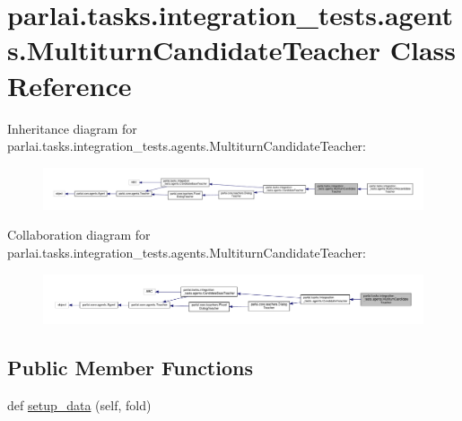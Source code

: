 \hypertarget{classparlai_1_1tasks_1_1integration__tests_1_1agents_1_1MultiturnCandidateTeacher}{}\section{parlai.\+tasks.\+integration\+\_\+tests.\+agents.\+Multiturn\+Candidate\+Teacher Class Reference}
\label{classparlai_1_1tasks_1_1integration__tests_1_1agents_1_1MultiturnCandidateTeacher}


Inheritance diagram for parlai.\+tasks.\+integration\+\_\+tests.\+agents.\+Multiturn\+Candidate\+Teacher\+:
\nopagebreak
\begin{figure}[H]
\begin{center}
\leavevmode
\includegraphics[width=350pt]{d1/d67/classparlai_1_1tasks_1_1integration__tests_1_1agents_1_1MultiturnCandidateTeacher__inherit__graph}
\end{center}
\end{figure}


Collaboration diagram for parlai.\+tasks.\+integration\+\_\+tests.\+agents.\+Multiturn\+Candidate\+Teacher\+:
\nopagebreak
\begin{figure}[H]
\begin{center}
\leavevmode
\includegraphics[width=350pt]{da/d2e/classparlai_1_1tasks_1_1integration__tests_1_1agents_1_1MultiturnCandidateTeacher__coll__graph}
\end{center}
\end{figure}
\subsection*{Public Member Functions}
\begin{DoxyCompactItemize}
\item 
def \hyperlink{classparlai_1_1tasks_1_1integration__tests_1_1agents_1_1MultiturnCandidateTeacher_aed2bfff52c3db13cb2a0d2acf41fdb8f}{setup\+\_\+data} (self, fold)
\end{DoxyCompactItemize}
